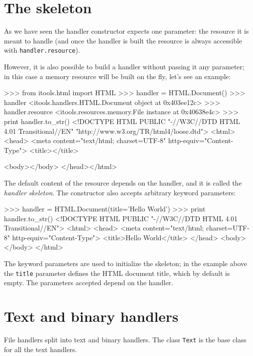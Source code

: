 \section{The skeleton}

As we have seen the handler constructor expects one parameter: the resource
it is meant to handle (and once the handler is built the resource is always
accessible with {\tt handler.resource}).

However, it is also possible to build a handler without passing it any
parameter; in this case a memory resource will be built on the fly, let's
see an example:

\begin{code}
    >>> from itools.html import HTML
    >>> handler = HTML.Document()
    >>> handler
    <itools.handlers.HTML.Document object at 0x403ee12c>
    >>> handler.resource
    <itools.resources.memory.File instance at 0x40638e4c>
    >>> print handler.to_str()
    <!DOCTYPE HTML PUBLIC "-//W3C//DTD HTML 4.01 Transitional//EN"
      "http://www.w3.org/TR/html4/loose.dtd">
    <html>
      <head>
        <meta content="text/html; charset=UTF-8" http-equiv="Content-Type">
        <title></title>
      
      <body></body>
    </head></html>
\end{code}

The default content of the resource depends on the handler, and it is called
the {\em handler skeleton}. The constructor also accepts arbitrary keyword
parameters:

\begin{code}
    >>> handler = HTML.Document(title='Hello World')
    >>> print handler.to_str()
    <!DOCTYPE HTML PUBLIC "-//W3C//DTD HTML 4.01 Transitional//EN">
    <html>
      <head>
        <meta content="text/html; charset=UTF-8" http-equiv="Content-Type">
        <title>Hello World</title>
      </head>
      <body></body>
    </html>
\end{code}

The keyword parameters are used to initialize the skeleton; in the example
above the {\tt title} parameter defines the HTML document title, which by
default is empty. The parameters accepted depend on the handler.


\section{Text and binary handlers}

File handlers split into text and binary handlers. The class {\tt Text}
is the base class for all the text handlers.

